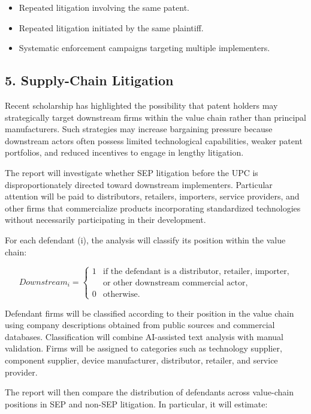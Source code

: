 \documentclass[12pt]{article}
\begin{document}
\begin{itemize}
\item Repeated litigation involving the same patent.
\item Repeated litigation initiated by the same plaintiff.
\item Systematic enforcement campaigns targeting multiple implementers.
\end{itemize}



\subsection*{5. Supply-Chain Litigation}

Recent scholarship has highlighted the possibility that patent holders may strategically target downstream firms within the value chain rather than principal manufacturers. Such strategies may increase bargaining pressure because downstream actors often possess limited technological capabilities, weaker patent portfolios, and reduced incentives to engage in lengthy litigation.

The report will investigate whether SEP litigation before the UPC is disproportionately directed toward downstream implementers. Particular attention will be paid to distributors, retailers, importers, service providers, and other firms that commercialize products incorporating standardized technologies without necessarily participating in their development.

For each defendant (i), the analysis will classify its position within the value chain:

\[
Downstream_i =
\begin{cases}
1 & \text{if the defendant is a distributor, retailer, importer,} \\
  & \text{or other downstream commercial actor,} \\
0 & \text{otherwise.}
\end{cases}
\]


Defendant firms will be classified according to their position in the value chain using company descriptions obtained from public sources and commercial databases. Classification will combine AI-assisted text analysis with manual validation. Firms will be assigned to categories such as technology supplier, component supplier, device manufacturer, distributor, retailer, and service provider.

The report will then compare the distribution of defendants across value-chain positions in SEP and non-SEP litigation. In particular, it will estimate:
\end{document}
